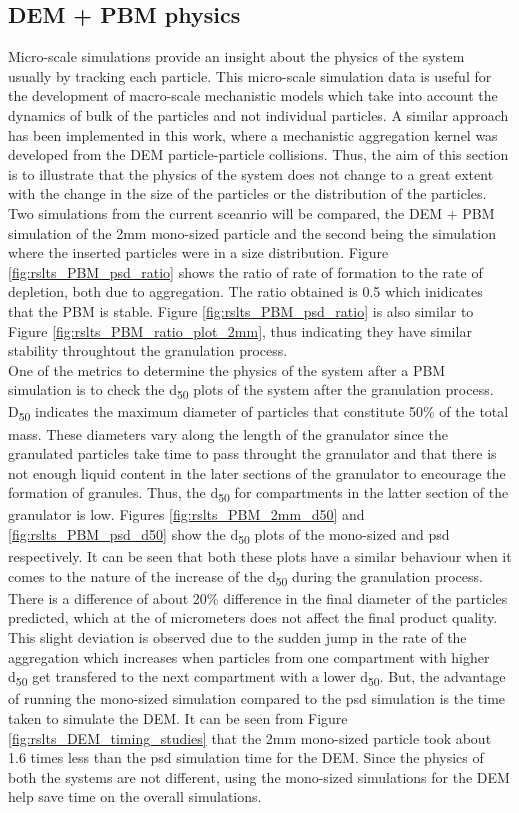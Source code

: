 \documentclass[preprint,11pt,authoryear]{elsarticle}
\begin{document}
\subsection{DEM + PBM physics}
\par Micro-scale simulations provide an insight about the physics of the system usually by tracking each particle. This micro-scale simulation data is useful for the development of macro-scale mechanistic models which take into account the dynamics of bulk of the particles and not individual particles. A similar approach has been implemented in this work, where a mechanistic aggregation kernel was developed from the DEM particle-particle collisions. Thus, the aim of this section is to illustrate that the physics of the system does not change to a great extent with the change in the size of the particles or the distribution of the particles.\\
Two simulations from the current sceanrio will be compared, the DEM + PBM simulation of the 2mm mono-sized particle and the second being the simulation where the inserted particles were in a size distribution. Figure \ref{fig:rslts_PBM_psd_ratio} shows the ratio of rate of formation to the rate of depletion, both due to aggregation. The ratio obtained is 0.5 which inidicates that the PBM is stable. Figure \ref{fig:rslts_PBM_psd_ratio} is also similar to Figure \ref{fig:rslts_PBM_ratio_plot_2mm}, thus indicating they have similar stability throughtout the granulation process. \\
One of the metrics to determine the physics of the system after a PBM simulation is to check the d\textsubscript{50} plots of the system after the granulation process. D\textsubscript{50} indicates the maximum diameter of particles that constitute 50\% of the total mass. These diameters vary along the length of the granulator since the granulated particles take time to pass throught the granulator and that there is not enough liquid content in the later sections of the granulator to encourage the formation of granules. Thus, the d\textsubscript{50} for compartments in the latter section of the granulator is low. Figures \ref{fig:rslts_PBM_2mm_d50} and \ref{fig:rslts_PBM_psd_d50} show the d\textsubscript{50} plots of the mono-sized and psd respectively. It can be seen that both these plots have a similar behaviour when it comes to the nature of the increase of the d\textsubscript{50} during the granulation process. There is a difference of about 20\% difference in the final diameter of the particles predicted, which at the of micrometers does not affect the final product quality. This slight deviation is observed due to the sudden jump in the rate of the aggregation which increases when particles from one compartment with higher d\textsubscript{50} get transfered to the next compartment with a lower d\textsubscript{50}. But, the advantage of running the mono-sized simulation compared to the psd simulation is the time taken to simulate the DEM. It can be seen from Figure \ref{fig:rslts_DEM_timing_studies} that the 2mm mono-sized particle took about 1.6 times less than the psd simulation time for the DEM. Since the physics of both the systems are not different, using the mono-sized simulations for the DEM help save time on the overall simulations. 
\end{document}
